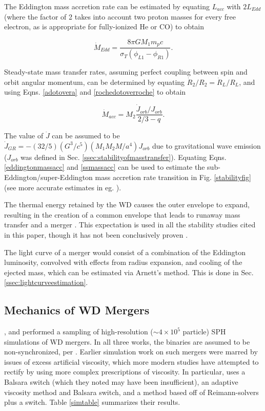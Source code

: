 The Eddington mass accretion rate can be estimated by equating $L_{acc}$ with $2L_{Edd}$ (where the factor of 2 takes into account two proton masses for every free electron, as is appropriate for fully-ionized He or CO) to obtain \citep{marsns04}

\begin{equation}
\dot{M}_{Edd} = \frac{8{\pi}GM_1m_pc}{\sigma_T(\phi_{L1} - \phi_{R1})}.
\label{eddingtonmassacc}
\end{equation}

\noindent Steady-state mass transfer rates, assuming perfect coupling between spin and orbit angular momentum, can be determined by equating $\dot{R}_2/R_2 = \dot{R}_L/R_L$, and using Eqns. \ref{adotovera} and \ref{rochedotoverroche} to obtain

\begin{equation}
\dot{M}_{acc} = M_2\frac{\dot{J}_{orb}/J_{orb}}{2/3 - q}.
\label{ssmassacc}
\end{equation}

\noindent The value of $\dot{J}$ can be assumed to be $\dot{J}_{GR} = -(32/5)(G^3/c^5)(M_1M_2M/a^4)J_{orb}$ due to gravitational wave emission ($J_{orb}$ was defined in Sec. \ref{ssec:stabilityofmasstransfer}).  Equating Eqns. \ref{eddingtonmassacc} and \ref{ssmassacc} can be used to estimate the sub-Eddington/super-Eddington mass accretion rate transition in Fig. \ref{stabilityfig} (see more accurate estimates in eg. \citeauthor{gokhpf07}).

The thermal energy retained by the WD causes the outer envelope to expand, resulting in the creation of a common envelope that leads to runaway mass transfer and a merger \citep{hanw99}.  This expectation is used in all the stability studies cited in this paper, though it has not been conclusively proven \citep{motl+07,marsns04,gokhpf07}.

The light curve of a merger would consist of a combination of the Eddington luminosity, convolved with effects from radius expansion, and cooling of the ejected mass, which can be estimated via Arnett's method.  This is done in Sec. \ref{ssec:lightcurveestimation}.

\subsection{Mechanics of WD Mergers}
\label{ssec:mechanicsofwdmergers}

\cite{guerig04}, \cite{yoonpr07} and \cite{loreig09} performed a sampling of high-resolution ($\sim 4 \times 10^5$ particle) SPH simulations of WD mergers.  In all three works, the binaries are assumed to be non-synchronized, per \citeauthor{segrcm97}.  Earlier simulation work on such mergers were marred by issues of excess artificial viscosity, which more modern studies have attempted to rectify by using more complex prescriptions of viscosity.  In particular, \citeauthor{guerig04} uses a Balsara switch (which they noted may have been insufficient), \citeauthor{yoonpr07} an adaptive viscosity method and Balsara switch, and \citeauthor{loreig09} a method based off of Reimann-solvers plus a switch.  Table \ref{simtable} summarizes their results.

